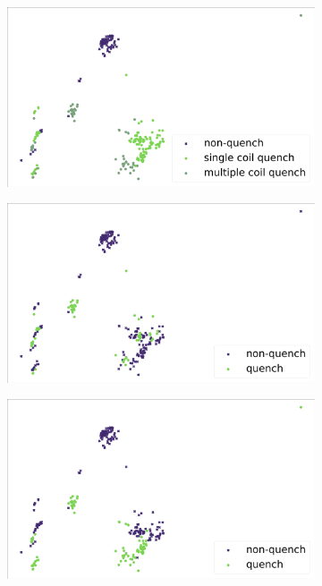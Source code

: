 \begin{figure}[!ht]
	\centering
	\begin{subfigure}{\linewidth}
		\includegraphics[width=\linewidth]{img/quench_dist_qlp/single_vs_multiple_Cnmod.png}
		\subcaption{}
	\end{subfigure}
	\begin{subfigure}{0.49\linewidth}
		\includegraphics[width=\linewidth]{img/quench_dist_qlp/quenches_coil_0_Cnmod.png}
		\subcaption{}
	\end{subfigure}
	\begin{subfigure}{0.49\linewidth}
		\includegraphics[width=\linewidth]{img/quench_dist_qlp/quenches_coil_1_Cnmod.png}

\end{subfigure}
\end{figure}
